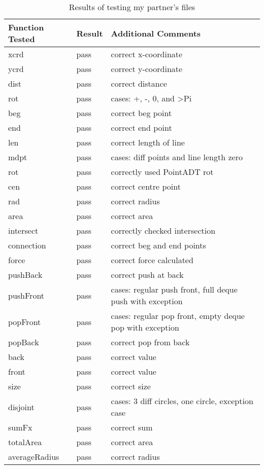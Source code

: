 \documentclass[12pt]{article}
\begin{document}
\begin{table}[h]
	\centering
	\begin{tabularx}{\linewidth}{ l|l|X }
		\toprule
		Function Tested & Result & Additional Comments\\
		\midrule
		xcrd & pass & correct x-coordinate\\
		ycrd & pass & correct y-coordinate\\
		dist & pass & correct distance\\
		rot & pass & cases: +, -, 0, and >Pi\\
		beg & pass & correct beg point\\
		end & pass & correct end point\\
		len & pass & correct length of line\\
		mdpt & pass & cases: diff points and line length zero\\
		rot & pass & correctly used PointADT rot\\
		cen & pass &  correct centre point\\
		rad & pass & correct radius\\
		area & pass & correct area\\
		intersect & pass & correctly checked intersection\\
		connection & pass & correct beg and end points\\
		force & pass & correct force calculated\\
		pushBack & pass & correct push at back\\
		pushFront & pass & cases: regular push front, full deque push with exception\\
		popFront & pass & cases: regular pop front, empty deque pop with exception\\
		popBack & pass & correct pop from back\\
		back & pass & correct value\\
		front & pass & correct value\\
		size & pass & correct size\\
		disjoint & pass & cases: 3 diff circles, one circle, exception case\\
		sumFx & pass & correct sum\\
		totalArea & pass & correct area\\
		averageRadius &  pass & correct radius\\

		\bottomrule
	\end{tabularx}
	\caption{Results of testing my partner's files}
	\label{Table : Results of testing my partner's files}
\end{table}
\end{document}
